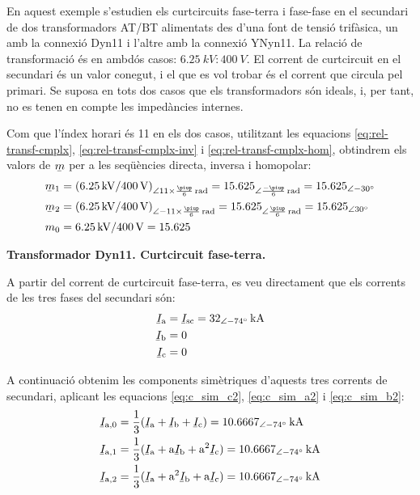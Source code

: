 	
\begin{exemple}[\CCasimSecTrafo{}]
	\addcontentsxms{\CCasimSecTrafo}
    En aquest exemple s'estudien els curtcircuits fase-terra i fase-fase en el secundari de dos transformadors AT/BT alimentats des d'una font de tensió trifàsica, un amb la connexió Dyn11 i l'altre amb la connexió YNyn11. La relació de transformació és en ambdós casos: $\qty{6,25}{kV}\!:\!\qty{400}{V}$. El corrent de curtcircuit en el secundari és un valor conegut, i el que es vol trobar és el corrent que circula pel primari. Se suposa en tots dos casos que els transformadors són ideals, i, per tant, no es tenen en compte les impedàncies internes.


    Com que l'índex horari és 11 en els dos casos, utilitzant les equacions \eqref{eq:rel-transf-cmplx}, \eqref{eq:rel-transf-cmplx-inv} i \eqref{eq:rel-transf-cmplx-hom}, obtindrem els valors de $\cmplx{m}$ per a les seqüències directa, inversa i homopolar:
    \begin{align*}
        \cmplx{m}_1 &= (\qty{6,25}{kV} / \qty{400}{V})_{\angle 11\times\frac{\piup}{6}\unit{\,rad}} =
        \num{15,625}_{\angle \frac{-\piup}{6}\unit{\,rad}} = \numpd{15,625}{-30} \\
        \cmplx{m}_2 &= (\qty{6,25}{kV} / \qty{400}{V})_{\angle -11\times\frac{\piup}{6}\unit{\,rad}} =
        \num{15,625}_{\angle \frac{\piup}{6}\unit{\,rad}} =\numpd{15,625}{30}  \\
        m_0 &= \qty{6,25}{kV} / \qty{400}{V} = \num{15,625}
    \end{align*}

   \textbf{ Transformador Dyn11. Curtcircuit fase-terra.}

    \begin{center}
       
    \end{center}

    A partir del corrent de curtcircuit fase-terra, es veu directament que els corrents de les tres fases del secundari són:
    \begin{align*}
        \cmplx{I}\ped{a} &= \cmplx{I}\ped{sc} = \qtypd{32}{-74}{kA} \\
        \cmplx{I}\ped{b} &= 0  \\
        \cmplx{I}\ped{c} &= 0
    \end{align*}

    A continuació obtenim les components simètriques d'aquests tres corrents de secundari, aplicant les equacions \eqref{eq:c_sim_c2}, \eqref{eq:c_sim_a2} i \eqref{eq:c_sim_b2}:
    \begin{align*}
        \cmplx{I}\ped{a,0} &= \frac{1}{3} (\cmplx{I}\ped{a} + \cmplx{I}\ped{b} +
        \cmplx{I}\ped{c}) = \qtypd{10,6667}{-74}{kA} \\
        \cmplx{I}\ped{a,1} &= \frac{1}{3} (\cmplx{I}\ped{a} + \au \cmplx{I}\ped{b} +
         \au^2 \cmplx{I}\ped{c}) = \qtypd{10,6667}{-74}{kA}  \\
        \cmplx{I}\ped{a,2} &= \frac{1}{3} (\cmplx{I}\ped{a} + \au^2 \cmplx{I}\ped{b} +
         \au \cmplx{I}\ped{c}) = \qtypd{10,6667}{-74}{kA}
    \end{align*}


\end{exemple}
